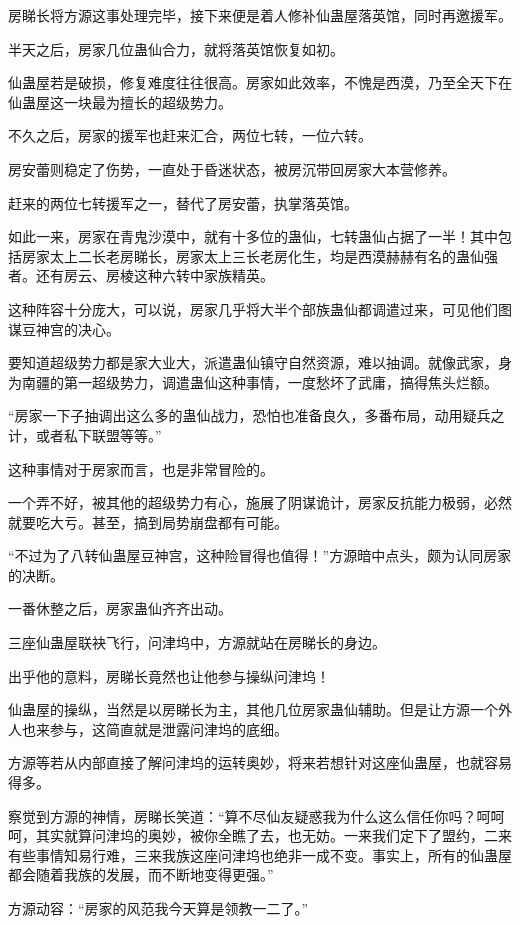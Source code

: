 \begin{this_body}
房睇长将方源这事处理完毕，接下来便是着人修补仙蛊屋落英馆，同时再邀援军。

半天之后，房家几位蛊仙合力，就将落英馆恢复如初。

仙蛊屋若是破损，修复难度往往很高。房家如此效率，不愧是西漠，乃至全天下在仙蛊屋这一块最为擅长的超级势力。

不久之后，房家的援军也赶来汇合，两位七转，一位六转。

房安蕾则稳定了伤势，一直处于昏迷状态，被房沉带回房家大本营修养。

赶来的两位七转援军之一，替代了房安蕾，执掌落英馆。

如此一来，房家在青鬼沙漠中，就有十多位的蛊仙，七转蛊仙占据了一半！其中包括房家太上二长老房睇长，房家太上三长老房化生，均是西漠赫赫有名的蛊仙强者。还有房云、房棱这种六转中家族精英。

这种阵容十分庞大，可以说，房家几乎将大半个部族蛊仙都调遣过来，可见他们图谋豆神宫的决心。

要知道超级势力都是家大业大，派遣蛊仙镇守自然资源，难以抽调。就像武家，身为南疆的第一超级势力，调遣蛊仙这种事情，一度愁坏了武庸，搞得焦头烂额。

“房家一下子抽调出这么多的蛊仙战力，恐怕也准备良久，多番布局，动用疑兵之计，或者私下联盟等等。”

这种事情对于房家而言，也是非常冒险的。

一个弄不好，被其他的超级势力有心，施展了阴谋诡计，房家反抗能力极弱，必然就要吃大亏。甚至，搞到局势崩盘都有可能。

“不过为了八转仙蛊屋豆神宫，这种险冒得也值得！”方源暗中点头，颇为认同房家的决断。

一番休整之后，房家蛊仙齐齐出动。

三座仙蛊屋联袂飞行，问津坞中，方源就站在房睇长的身边。

出乎他的意料，房睇长竟然也让他参与操纵问津坞！

仙蛊屋的操纵，当然是以房睇长为主，其他几位房家蛊仙辅助。但是让方源一个外人也来参与，这简直就是泄露问津坞的底细。

方源等若从内部直接了解问津坞的运转奥妙，将来若想针对这座仙蛊屋，也就容易得多。

察觉到方源的神情，房睇长笑道：“算不尽仙友疑惑我为什么这么信任你吗？呵呵呵，其实就算问津坞的奥妙，被你全瞧了去，也无妨。一来我们定下了盟约，二来有些事情知易行难，三来我族这座问津坞也绝非一成不变。事实上，所有的仙蛊屋都会随着我族的发展，而不断地变得更强。”

方源动容：“房家的风范我今天算是领教一二了。”


\end{this_body}
